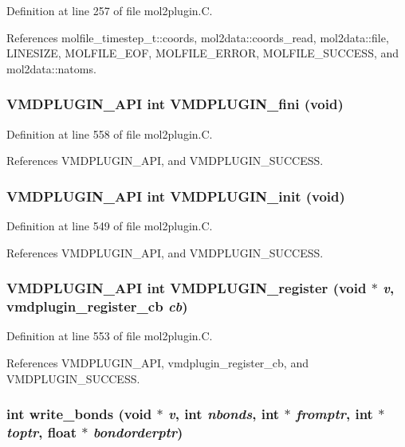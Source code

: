 Definition at line 257 of file mol2plugin.C.

References molfile\_\-timestep\_\-t::coords, mol2data::coords\_\-read, mol2data::file, LINESIZE, MOLFILE\_\-EOF, MOLFILE\_\-ERROR, MOLFILE\_\-SUCCESS, and mol2data::natoms.
\subsubsection{\setlength{\rightskip}{0pt plus 5cm}VMDPLUGIN\_\-API int VMDPLUGIN\_\-fini (void)}\label{mol2plugin_8C_a16}




Definition at line 558 of file mol2plugin.C.

References VMDPLUGIN\_\-API, and VMDPLUGIN\_\-SUCCESS.
\subsubsection{\setlength{\rightskip}{0pt plus 5cm}VMDPLUGIN\_\-API int VMDPLUGIN\_\-init (void)}\label{mol2plugin_8C_a14}




Definition at line 549 of file mol2plugin.C.

References VMDPLUGIN\_\-API, and VMDPLUGIN\_\-SUCCESS.
\subsubsection{\setlength{\rightskip}{0pt plus 5cm}VMDPLUGIN\_\-API int VMDPLUGIN\_\-register (void $\ast$ {\em v}, {\bf vmdplugin\_\-register\_\-cb} {\em cb})}\label{mol2plugin_8C_a15}




Definition at line 553 of file mol2plugin.C.

References VMDPLUGIN\_\-API, vmdplugin\_\-register\_\-cb, and VMDPLUGIN\_\-SUCCESS.
\subsubsection{\setlength{\rightskip}{0pt plus 5cm}int write\_\-bonds (void $\ast$ {\em v}, int {\em nbonds}, int $\ast$ {\em fromptr}, int $\ast$ {\em toptr}, float $\ast$ {\em bondorderptr})\hspace{0.3cm}{\tt  [static]}}\label{mol2plugin_8C_a10}




